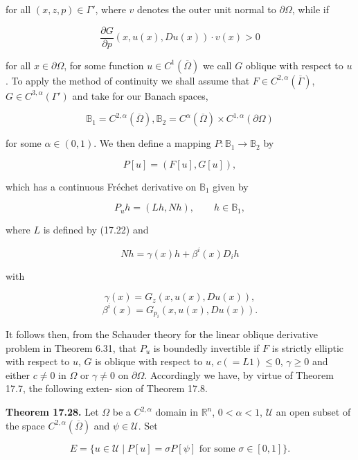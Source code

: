for all $(x,z,p)\in \Gamma'$, where $v$ denotes the outer unit normal to $\partial\Omega$, while if

\begin{equation}
\tag{17.103}
\frac{\partial G}{\partial p}(x,u(x),Du(x))\cdot v(x) > 0
\end{equation}

for all $x\in \partial\Omega$, for some function $u\in C^{1}(\overline{\Omega})$ we call $G$ oblique with respect to $u$. To
apply the method of continuity we shall assume that $F\in C^{2,\alpha}(\overline{\Gamma})$, $G\in C^{3,\alpha}(\Gamma')$ and
take for our Banach spaces,

\[
\mathbb{B}_1 = C^{2,\alpha}(\overline{\Omega}), \mathbb{B}_2 = C^{\alpha}(\overline{\Omega}) \times C^{1,\alpha}(\partial\Omega)
\]

for some $\alpha \in (0,1)$. We then define a mapping $P : \mathbb{B}_1 \to \mathbb{B}_2$ by

\[
P[u] = (F[u], G[u]),
\]

which has a continuous Fr\'echet derivative on $\mathbb{B}_1$ given by

\begin{equation}
\tag{17.104}
P_u h = (Lh, Nh), \qquad h\in \mathbb{B}_1,
\end{equation}

where $L$ is defined by (17.22) and

\[
Nh = \gamma(x)h + \beta^i(x)D_i h
\]

with

\[
\gamma(x) = G_z(x,u(x),Du(x)),
\]
\[
\beta^i(x) = G_{p_i}(x,u(x),Du(x)).
\]

It follows then, from the Schauder theory for the linear oblique derivative problem
in Theorem 6.31, that $P_u$ is boundedly invertible if $F$ is strictly elliptic with respect
to $u$, $G$ is oblique with respect to $u$, $c(=L1)\leq 0$, $\gamma \geq 0$ and either $c \neq 0$ in $\Omega$ or
$\gamma \neq 0$ on $\partial\Omega$. Accordingly we have, by virtue of Theorem 17.7, the following exten-
sion of Theorem 17.8.

\textbf{Theorem 17.28.} Let $\Omega$ be a $C^{2,\alpha}$ domain in $\mathbb{R}^n$, $0 < \alpha < 1$, $\mathcal{U}$ an open subset of the
space $C^{2,\alpha}(\overline{\Omega})$ and $\psi \in \mathcal{U}$. Set

\begin{equation}
\tag{17.105}
E = \{u \in \mathcal{U}\mid P[u] = \sigma P[\psi] \text{ for some } \sigma \in [0,1]\}.
\end{equation}


